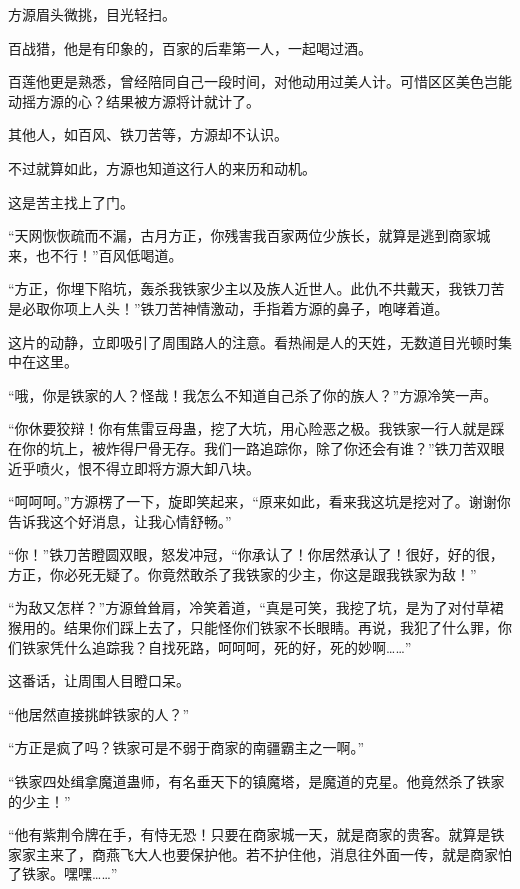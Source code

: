 
\begin{this_body}



方源眉头微挑，目光轻扫。

百战猎，他是有印象的，百家的后辈第一人，一起喝过酒。

百莲他更是熟悉，曾经陪同自己一段时间，对他动用过美人计。可惜区区美色岂能动摇方源的心？结果被方源将计就计了。

其他人，如百风、铁刀苦等，方源却不认识。

不过就算如此，方源也知道这行人的来历和动机。

这是苦主找上了门。

“天网恢恢疏而不漏，古月方正，你残害我百家两位少族长，就算是逃到商家城来，也不行！”百风低喝道。

“方正，你埋下陷坑，轰杀我铁家少主以及族人近世人。此仇不共戴天，我铁刀苦是必取你项上人头！”铁刀苦神情激动，手指着方源的鼻子，咆哮着道。

这片的动静，立即吸引了周围路人的注意。看热闹是人的天姓，无数道目光顿时集中在这里。

“哦，你是铁家的人？怪哉！我怎么不知道自己杀了你的族人？”方源冷笑一声。

“你休要狡辩！你有焦雷豆母蛊，挖了大坑，用心险恶之极。我铁家一行人就是踩在你的坑上，被炸得尸骨无存。我们一路追踪你，除了你还会有谁？”铁刀苦双眼近乎喷火，恨不得立即将方源大卸八块。

“呵呵呵。”方源楞了一下，旋即笑起来，“原来如此，看来我这坑是挖对了。谢谢你告诉我这个好消息，让我心情舒畅。”

“你！”铁刀苦瞪圆双眼，怒发冲冠，“你承认了！你居然承认了！很好，好的很，方正，你必死无疑了。你竟然敢杀了我铁家的少主，你这是跟我铁家为敌！”

“为敌又怎样？”方源耸耸肩，冷笑着道，“真是可笑，我挖了坑，是为了对付草裙猴用的。结果你们踩上去了，只能怪你们铁家不长眼睛。再说，我犯了什么罪，你们铁家凭什么追踪我？自找死路，呵呵呵，死的好，死的妙啊……”

这番话，让周围人目瞪口呆。

“他居然直接挑衅铁家的人？”

“方正是疯了吗？铁家可是不弱于商家的南疆霸主之一啊。”

“铁家四处缉拿魔道蛊师，有名垂天下的镇魔塔，是魔道的克星。他竟然杀了铁家的少主！”

“他有紫荆令牌在手，有恃无恐！只要在商家城一天，就是商家的贵客。就算是铁家家主来了，商燕飞大人也要保护他。若不护住他，消息往外面一传，就是商家怕了铁家。嘿嘿……”


\end{this_body}
